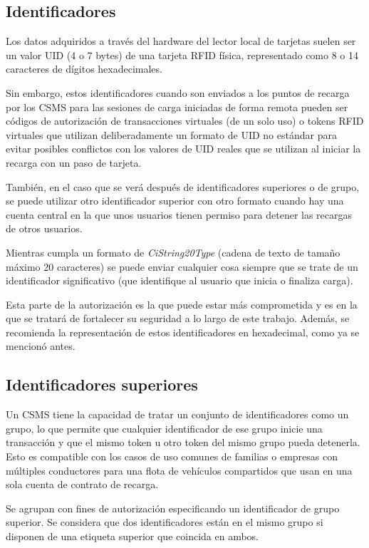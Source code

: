 \documentclass[12pt,a4paper,onecolumn,oneside]{report}
\begin{document}
\subsection{Identificadores}
\label{Identificadores}

Los datos adquiridos a través del hardware del lector local de tarjetas suelen ser un valor UID (4 o 7 bytes) de una tarjeta RFID física, representado como 8 o 14 caracteres de dígitos hexadecimales. 

Sin embargo, estos identificadores cuando son enviados a los puntos de recarga por los CSMS para las sesiones de carga iniciadas de forma remota pueden ser códigos de autorización de transacciones virtuales (de un solo uso) o tokens RFID virtuales que utilizan deliberadamente un formato de UID no estándar para evitar posibles conflictos con los valores de UID reales que se utilizan al iniciar la recarga con un paso de tarjeta.

También, en el caso que se verá después de identificadores superiores o de grupo, se puede utilizar otro identificador superior con otro formato cuando hay una cuenta central en la que unos usuarios tienen permiso para detener las recargas de otros usuarios.

Mientras cumpla un formato de \textit{CiString20Type} (cadena de texto de tamaño máximo 20 caracteres) se puede enviar cualquier cosa siempre que se trate de un identificador significativo (que identifique al usuario que inicia o finaliza carga).

Esta parte de la autorización es la que puede estar más comprometida y es en la que se tratará de fortalecer su seguridad a lo largo de este trabajo. Además, se recomienda la representación de estos identificadores en hexadecimal, como ya se mencionó antes.


\subsection{Identificadores superiores}
\label{Identificadores superiores}

Un CSMS tiene la capacidad de tratar un conjunto de identificadores como un grupo, lo que permite que cualquier identificador de ese grupo inicie una transacción y que el mismo token u otro token del mismo grupo pueda detenerla. Esto es compatible con los casos de uso comunes de familias o empresas con múltiples conductores para una flota de vehículos compartidos que usan en una sola cuenta de contrato de recarga.

Se agrupan con fines de autorización especificando un identificador de grupo superior. Se considera que dos identificadores están en el mismo grupo si disponen de una etiqueta superior que coincida en ambos.
\end{document}

